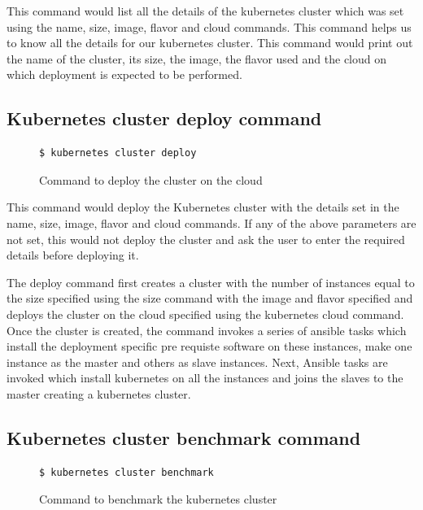 \documentclass[9pt,twocolumn,twoside]{../../styles/osajnl}
\begin{document}
{This command would list all the details of the kubernetes cluster
which was set using the name, size, image, flavor and cloud
commands. This command helps us to know all the details for our
kubernetes cluster. This command would print out the name of the
cluster, its size, the image, the flavor used and the cloud on which
deployment is expected to be performed.

\subsection{Kubernetes cluster deploy command}
\begin{figure}[H]
\begin{verbatim}
$ kubernetes cluster deploy
\end{verbatim}
\caption{Command to deploy the cluster on the cloud}
\vspace{-4mm}
\label{Command to deploy the cluster on the cloud}
\end{figure}

This command would deploy the Kubernetes cluster with the details set
in the name, size, image, flavor and cloud commands. If any of the
above parameters are not set, this would not deploy the cluster and
ask the user to enter the required details before deploying it.

\noindent
The deploy command first creates a cluster with the number of
instances equal to the size specified using the size command with the
image and flavor specified and deploys the cluster on the cloud
specified using the kubernetes cloud command. Once the cluster is
created, the command invokes a series of ansible tasks which install
the deployment specific pre requiste software on these instances, make
one instance as the master and others as slave instances. Next,
Ansible tasks are invoked which install kubernetes on all the
instances and joins the slaves to the master creating a kubernetes
cluster.

\subsection{Kubernetes cluster benchmark command}
\begin{figure}[H]
\begin{verbatim}
$ kubernetes cluster benchmark
\end{verbatim}
\caption{Command to benchmark the kubernetes cluster}
\vspace{-4mm}
\label{Command to benchmark the kubernetes cluster}
\end{figure}

}
\end{document}
